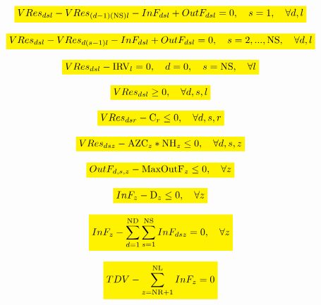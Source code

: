 \documentclass{singlecol}
\newcommand{\mathcolorbox}[2]{\colorbox{#1}{$\displaystyle #2$}}
\theoremstyle{TH}{
\newtheorem{lemma}{Lemma}
\newtheorem{theorem}[lemma]{Theorem}
\newtheorem{corrolary}[lemma]{Corrolary}
\newtheorem{conjecture}[lemma]{Conjecture}
\newtheorem{proposition}[lemma]{Proposition}
\newtheorem{claim}[lemma]{Claim}
\newtheorem{stheorem}[lemma]{Wrong Theorem}
\newtheorem{algorithm}{Algorithm}
}
\theoremstyle{THrm}{
\newtheorem{definition}{Definition}[section]
\newtheorem{question}{Question}[section]
\newtheorem{remark}{Remark}
\newtheorem{scheme}{Scheme}
}
\theoremstyle{THhit}{
\newtheorem{case}{Case}[section]
}
\begin{document}
\begin{equation}
	\mathcolorbox{yellow}{VRes_{dsl} - VRes_{(d-1)(\mathrm{NS})l} - InF_{dsl} + OutF_{dsl} = 0, \quad s=1, \quad \forall{d,l}}
 	\label{eq:volResT1}
\end{equation}

\begin{equation}
	\mathcolorbox{yellow}{VRes_{dsl} - VRes_{d(s-1)l} - InF_{dsl} + OutF_{dsl} = 0, \quad s=2,...,\mathrm{NS}, \quad \forall{d,l}}
	\label{eq:volRem!T1}
\end{equation}

\begin{equation}
	\mathcolorbox{yellow}{VRes_{dsl} - \mathrm{IRV}_l = 0, \quad d = 0, \quad s = \mathrm{NS}, \quad \forall{l}}
	\label{eq:volRStart}
\end{equation}

\begin{equation}
	\mathcolorbox{yellow}{VRes_{dsl} \geq 0, \quad \forall{d,s,l}}
	\label{eq:minRV}
\end{equation}

\begin{equation}
	\mathcolorbox{yellow}{VRes_{dsr} - \mathrm{C}_{r} \leq 0, \quad \forall{d,s,r}}
	\label{eq:maxRV}
\end{equation}

\begin{equation}
	\mathcolorbox{yellow}{VRes_{dsz} - \mathrm{AZC}_z*\mathrm{NH}_z \leq 0, \quad \forall{d,s,z}}
	\label{eq:maxRZV}
\end{equation}

\begin{equation}
	\mathcolorbox{yellow}{OutF_{d,s,z} -  \mathrm{MaxOutF}_z  \leq 0,  \quad \forall z}
	\label{eq:outFRRes}
\end{equation}

\begin{equation}
	\mathcolorbox{yellow}{InF_{z} -  \mathrm{D}_z  \leq 0,  \quad \forall z}
	\label{eq:demandRes}
\end{equation}

\begin{equation}
	\mathcolorbox{yellow}{InF_{z} - \sum_{d=1}^{\mathrm{ND}}\sum_{s=1}^{\mathrm{NS}}{InF_{dsz}} = 0, \quad \forall z}
	\label{eq:evalTOutFZone}
\end{equation}

\begin{equation}
	\mathcolorbox{yellow}{TDV - \sum_{z=\mathrm{NR}+1}^{\mathrm{NL}}{InF_{z}} = 0}
	\label{eq:evalTOutF}
\end{equation}
\end{document}
